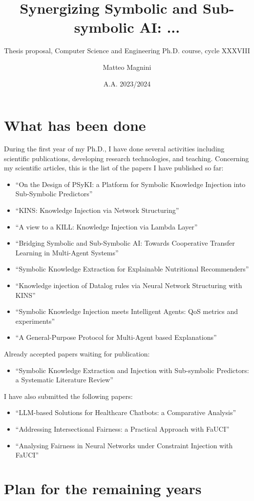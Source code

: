 \documentclass[]{scrartcl}
\title{
    Synergizing Symbolic and Sub-symbolic AI: ...
}
\subtitle{Thesis proposal, Computer Science and Engineering Ph.D. course, cycle XXXVIII}
\author{Matteo Magnini}
\date{A.A. 2023/2024}
\begin{document}
    
    \maketitle
    
    \begin{abstract}
        
    \end{abstract}
    
    \section{What has been done}
    \label{sec:done}
    During the first year of my Ph.D., I have done several activities including scientific publications, developing research technologies, and teaching.
    Concerning my scientific articles, this is the list of the papers I have published so far:
    \begin{itemize}
        \item ``On the Design of PSyKI: a Platform for Symbolic Knowledge Injection into Sub-Symbolic Predictors''~\cite{psyki-extraamas2022}
        \item ``KINS: Knowledge Injection via Network Structuring''\cite{kins-cilc2022}
        \item ``A view to a KILL: Knowledge Injection via Lambda Layer''\cite{kill-woa2022}
        \item ``Bridging Symbolic and Sub-Symbolic AI: Towards Cooperative Transfer Learning in Multi-Agent Systems''\cite{ctl-aixia2022}
        \item ``Symbolic Knowledge Extraction for Explainable Nutritional Recommenders''\cite{skerecommender-cmbp235}
        \item ``Knowledge injection of Datalog rules via Neural Network Structuring with KINS''\cite{kins-jlc2023}
        \item ``Symbolic Knowledge Injection meets Intelligent Agents: QoS metrics and experiments''\cite{skiqos-jaamas37}
        \item ``A General-Purpose Protocol for Multi-Agent based Explanations''\cite{explanationprotocol-extraamas2023}
    \end{itemize}
    Already accepted papers waiting for publication:
    \begin{itemize}
        \item ``Symbolic Knowledge Extraction and Injection with Sub-symbolic Predictors: a Systematic Literature Review''
    \end{itemize}
    I have also submitted the following papers:
    \begin{itemize}
        \item ``LLM-based Solutions for Healthcare Chatbots: a Comparative Analysis''
        \item ``Addressing Intersectional Fairness: a Practical Approach with FaUCI''
        \item ``Analysing Fairness in Neural Networks under Constraint Injection with FaUCI''
    \end{itemize}



    \section{Plan for the remaining years}
    \label{sec:todo}

    
    
    
    
\end{document}
